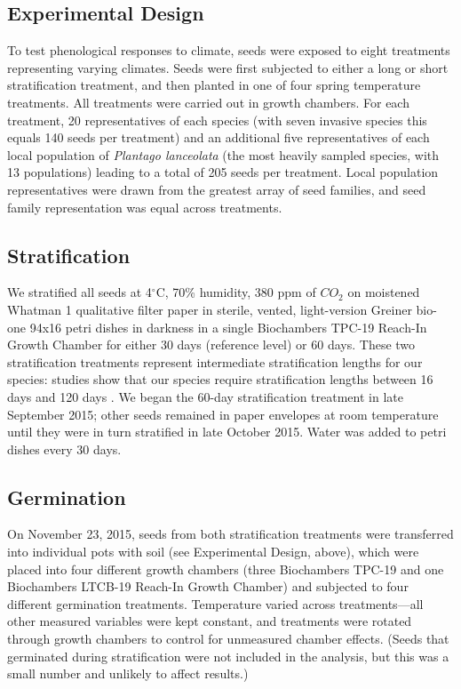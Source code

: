 \documentclass[12pt]{article}\usepackage[]{graphicx}\usepackage[]{color}
\begin{document}
	\subsection{Experimental Design} 
	To test phenological responses to climate, seeds were exposed to eight treatments representing varying climates. Seeds were first subjected to either a long or short stratification treatment, and then planted in one of four spring temperature treatments. All treatments were carried out in growth chambers. For each treatment, 20 representatives of each species (with seven invasive species this equals 140 seeds per treatment) and an additional five representatives of each local population of \textit{Plantago lanceolata} (the most heavily sampled species, with 13 populations) leading to a total of 205 seeds per treatment. Local population representatives were drawn from the greatest array of seed families, and seed family representation was equal across treatments. 
	
	\subsection{Stratification} 
	We stratified all seeds at 4$^\circ$C, 70\% humidity, 380 ppm of $CO_2$ \parencite[e.g.,][]{Meekins1999,Popay1970} on moistened Whatman 1 qualitative filter paper in sterile, vented, light-version Greiner bio-one 94x16 petri dishes in darkness \parencite{Baskin1998,Popay1970} in a single Biochambers TPC-19 Reach-In Growth Chamber for either 30 days (reference level) or 60 days. These two stratification treatments represent intermediate stratification lengths for our species: studies show that our species require stratification lengths between 16 days \parencite{Popay1970} and 120 days \parencite{Meekins1999}. We began the 60-day stratification treatment in late September 2015; other seeds remained in paper envelopes at room temperature until they were in turn stratified in late October 2015.  Water was added to petri dishes every 30 days.
	
	\subsection{Germination}
	On November 23, 2015, seeds from both stratification treatments were transferred into individual pots with soil (see Experimental Design, above), which were placed into four different growth chambers (three Biochambers TPC-19 and one Biochambers LTCB-19 Reach-In Growth Chamber) and subjected to four different germination treatments. Temperature varied across treatments---all other measured variables were kept constant, and treatments were rotated through growth chambers to control for unmeasured chamber effects. (Seeds that germinated during stratification were not included in the analysis, but this was a small number and unlikely to affect results.)
	
\end{document}
